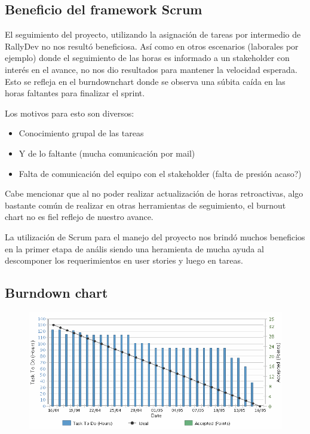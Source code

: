 \subsection{Beneficio del framework Scrum}
El seguimiento del proyecto, utilizando la asignaci\'on de tareas por intermedio de RallyDev no nos result\'o beneficiosa. As\'i como en otros escenarios (laborales por ejemplo) donde el seguimiento de las horas es informado a un stakeholder con inter\'es en el avance, no nos dio resultados para mantener la velocidad esperada. Esto se refleja en el burndownchart donde se observa una s\'ubita ca\'ida en las horas faltantes para finalizar el sprint.

Los motivos para esto son diversos:
\begin{itemize}
    \item Conocimiento grupal de las tareas 
    \item Y de lo faltante (mucha comunicaci\'on por mail)
    \item Falta de comunicaci\'on del equipo con el stakeholder (falta de presi\'on acaso?)
\end{itemize}

Cabe mencionar que al no poder realizar actualización de horas retroactivas, algo bastante común de realizar en otras herramientas de seguimiento, el burnout chart no es fiel reflejo de nuestro avance.

La utilizaci\'on de Scrum para el manejo del proyecto nos brindó muchos beneficios en la primer etapa de an\'alis siendo una heramienta de mucha ayuda al descomponer los requerimientos en user stories y luego en tareas.

\subsection{Burndown chart}
\begin{figure}[ht]
\includegraphics[width=\textwidth]{./imgs/burndown.png}
\end{figure}
